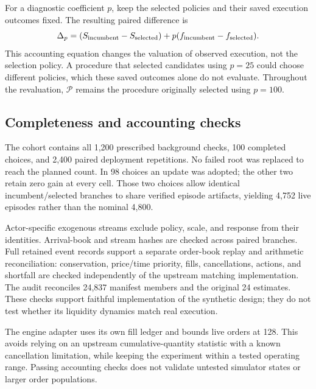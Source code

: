 \documentclass[10pt,letterpaper]{article}
\begin{document}
For a diagnostic coefficient $p$, keep the selected policies and their saved execution outcomes fixed. The resulting paired difference is
\begin{equation}
\Delta_p=(S_{\rm incumbent}-S_{\rm selected})
+p(f_{\rm incumbent}-f_{\rm selected}).\label{eq:revalue}
\end{equation}
This accounting equation changes the valuation of observed execution, not the selection policy. A procedure that selected candidates using $p=25$ could choose different policies, which these saved outcomes alone do not evaluate. Throughout the revaluation, $\mathcal P$ remains the procedure originally selected using $p=100$.

\subsection{Completeness and accounting checks}
The cohort contains all 1,200 prescribed background checks, 100 completed choices, and 2,400 paired deployment repetitions. No failed root was replaced to reach the planned count. In 98 choices an update was adopted; the other two retain zero gain at every cell. Those two choices allow identical incumbent/selected branches to share verified episode artifacts, yielding 4,752 live episodes rather than the nominal 4,800.

Actor-specific exogenous streams exclude policy, scale, and response from their identities. Arrival-book and stream hashes are checked across paired branches. Full retained event records support a separate order-book replay and arithmetic reconciliation: conservation, price/time priority, fills, cancellations, actions, and shortfall are checked independently of the upstream matching implementation. The audit reconciles 24,837 manifest members and the original 24 estimates. These checks support faithful implementation of the synthetic design; they do not test whether its liquidity dynamics match real execution.

The engine adapter uses its own fill ledger and bounds live orders at 128. This avoids relying on an upstream cumulative-quantity statistic with a known cancellation limitation, while keeping the experiment within a tested operating range. Passing accounting checks does not validate untested simulator states or larger order populations.
\end{document}
